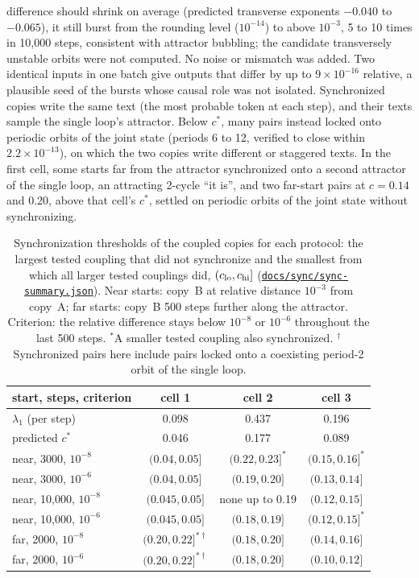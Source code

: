 \documentclass[11pt,letterpaper]{article}
\newcommand{\repourl}{https://github.com/tdj28/neural-shrimp}
\newcommand{\reporef}{arxiv-v1}
\newcommand{\repo}[1]{\href{\repourl/blob/\reporef/#1}{\nolinkurl{#1}}}
\begin{document}
difference should shrink on average (predicted transverse exponents $-0.040$ to $-0.065$), it still burst from the
rounding level ($10^{-14}$) to above $10^{-3}$, 5 to 10 times in 10,000 steps, consistent with attractor bubbling; the
candidate transversely unstable orbits were not computed. No noise or mismatch was added. Two identical inputs in one
batch give outputs that differ by up to $9\times10^{-16}$ relative, a plausible seed of the bursts whose causal role was
not isolated. Synchronized copies write the same text (the most probable token at each step), and their texts sample
the single loop's attractor. Below $c^*$, many pairs
instead locked onto periodic orbits of the joint state (periods 6 to 12, verified to close within $2.2\times10^{-13}$),
on which the two copies write different or staggered texts. In the first cell, some starts far from the attractor synchronized onto a second attractor of the single loop, an
attracting 2-cycle ``it is'', and two far-start pairs at $c=0.14$ and 0.20, above that cell's $c^*$, settled on
periodic orbits of the joint state without synchronizing.

\begin{table}[tbp]
\centering\small
\caption{Synchronization thresholds of the coupled copies for each protocol: the largest tested coupling that did not
synchronize and the smallest from which all larger tested couplings did, $(c_{\rm lo},c_{\rm hi}]$
(\repo{docs/sync/sync-summary.json}). Near starts: copy~B at relative distance $10^{-3}$ from copy~A; far starts:
copy~B 500 steps further along the attractor. Criterion: the relative difference stays below $10^{-8}$ or $10^{-6}$
throughout the last 500 steps. $^{*}$A smaller tested coupling also synchronized. $^{\dagger}$Synchronized pairs here include pairs locked onto a coexisting period-2 orbit of the single loop.}
\label{tab:sync}
\begin{tabular}{lccc}
\toprule
start, steps, criterion & cell 1 & cell 2 & cell 3 \\
\midrule
$\lambda_1$ (per step) & 0.098 & 0.437 & 0.196 \\
predicted $c^*$ & 0.046 & 0.177 & 0.089 \\
near, 3000, $10^{-8}$ & $(0.04,0.05]$ & $(0.22,0.23]^{*}$ & $(0.15,0.16]^{*}$ \\
near, 3000, $10^{-6}$ & $(0.04,0.05]$ & $(0.19,0.20]$ & $(0.13,0.14]$ \\
near, 10,000, $10^{-8}$ & $(0.045,0.05]$ & none up to 0.19 & $(0.12,0.15]$ \\
near, 10,000, $10^{-6}$ & $(0.045,0.05]$ & $(0.18,0.19]$ & $(0.12,0.15]^{*}$ \\
far, 2000, $10^{-8}$ & $(0.20,0.22]^{*\dagger}$ & $(0.18,0.20]$ & $(0.14,0.16]$ \\
far, 2000, $10^{-6}$ & $(0.20,0.22]^{*\dagger}$ & $(0.18,0.20]$ & $(0.10,0.12]$ \\
\bottomrule
\end{tabular}
\end{table}
\end{document}
